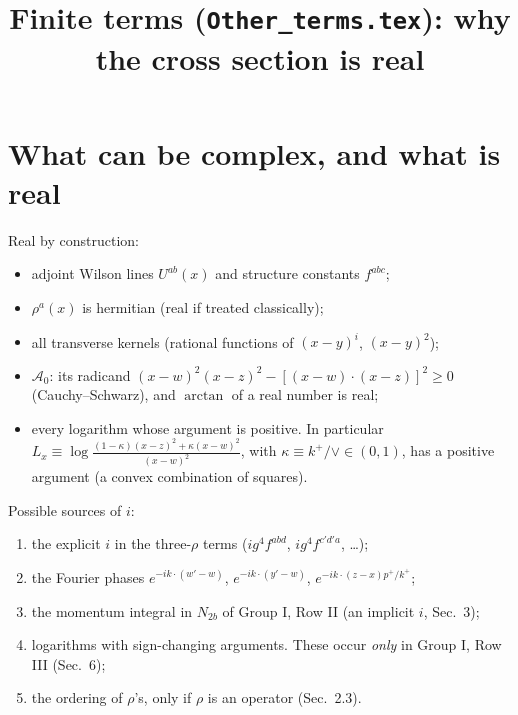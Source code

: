 \documentclass[10pt]{article}
\title{Finite terms (\texttt{Other\_terms.tex}): why the cross section is real}
\author{}
\date{}
\numberwithin{equation}{section}
\begin{document}
\maketitle
\vspace{-2.5em}

\section{What can be complex, and what is real}
Real by construction:
\begin{itemize}
\item adjoint Wilson lines $U^{ab}(x)$ and structure constants $f^{abc}$;
\item $\rho^a(x)$ is hermitian (real if treated classically);
\item all transverse kernels (rational functions of $(x-y)^i$, $(x-y)^2$);
\item $\mathcal A_0$: its radicand $(x-w)^2(x-z)^2-[(x-w)\cdot(x-z)]^2\ge0$ (Cauchy--Schwarz), and $\arctan$ of a real number is real;
\item every logarithm whose argument is positive. In particular
$L_x\equiv\log\frac{(1-\kappa)(x-z)^2+\kappa(x-w)^2}{(x-w)^2}$, with $\kappa\equiv k^+/\vee\in(0,1)$, has a positive argument (a convex combination of squares).
\end{itemize}
Possible sources of $i$:
\begin{enumerate}
\item[(C1)] the explicit $i$ in the three-$\rho$ terms ($i g^4 f^{abd}$, $ig^4f^{c'd'a}$, \dots);
\item[(C2)] the Fourier phases $e^{-ik\cdot(w'-w)}$, $e^{-ik\cdot(y'-w)}$, $e^{-ik\cdot(z-x)p^+/k^+}$;
\item[(C3)] the momentum integral in $N_{2b}$ of Group I, Row II (an implicit $i$, Sec.~3);
\item[(C4)] logarithms with sign-changing arguments. These occur \emph{only} in Group I, Row III (Sec.~6);
\item[(C5)] the ordering of $\rho$'s, only if $\rho$ is an operator (Sec.~2.3).
\end{enumerate}
\end{document}
